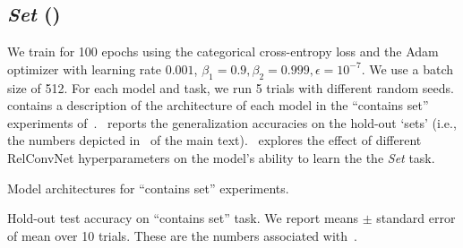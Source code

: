 \subsection{\textit{Set} ()}

We train for 100 epochs using the categorical cross-entropy loss and the Adam optimizer with learning rate $0.001$, $\beta_1 = 0.9, \beta_2 = 0.999, \epsilon = 10^{-7}$. We use a batch size of 512. For each model and task, we run 5 trials with different random seeds. contains a description of the architecture of each model in the ``contains set'' experiments of~.~ reports the generalization accuracies on the hold-out `sets' (i.e., the numbers depicted in~ of the main text).~ explores the effect of different RelConvNet hyperparameters on the model's ability to learn the the \textit{Set} task.

\begin{table}[H]
    \centering
    
    \caption{Model architectures for ``contains set'' experiments.}\label{tab:set_architectures}
\end{table}

\begin{table}[H]
    \centering
    
    \caption{Hold-out test accuracy on ``contains set'' task. We report means $\pm$ standard error of mean over 10 trials. These are the numbers associated with~.}\label{tab:set_acc}
\end{table}


